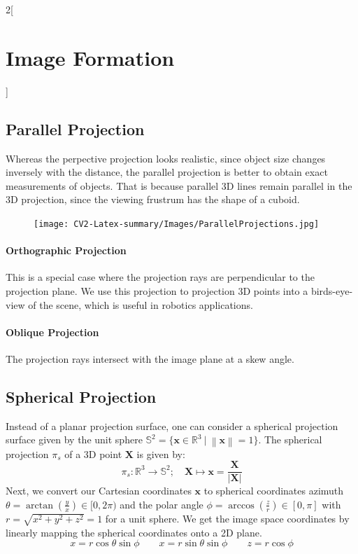 \documentclass[oneside,fontsize=11pt,paper=a4]{scrartcl}
\newcommand\norm[1]{\left\lVert#1\right\rVert}
\begin{document}
\begin{multicols}{2}[\section{Image Formation}]
\subsection{Parallel Projection}

Whereas the perpective projection looks realistic, since object size changes inversely with the distance, the parallel projection is better to obtain exact measurements of objects. That is because parallel 3D lines remain parallel in the 3D projection, since the viewing frustrum has the shape of a cuboid.

\begin{figure}
    \texttt{[image: CV2-Latex-summary/Images/ParallelProjections.jpg]}
\end{figure}

\paragraph{Orthographic Projection} This is a special case where the projection rays are perpendicular to the projection plane. We use this projection to projection 3D points into a birds-eye-view of the scene, which is useful in robotics applications.

\paragraph{Oblique Projection} The projection rays intersect with the image plane at a skew angle. 

\subsection{Spherical Projection}
Instead of a planar projection surface, one can consider a spherical projection surface given by the unit sphere $\mathbb{S}^2 = \{\mathbf{x} \in \mathbb{R}^3 \ \vert \ \norm{\mathbf{x}}=1\}$.
The spherical projection $\pi_s$ of a 3D point $\boldsymbol{X}$ is given by:
\begin{equation*}
    \pi_s: \mathbb{R}^3 \rightarrow \mathbb{S}^2; \quad \boldsymbol{X} \mapsto \boldsymbol{x} = \frac{\boldsymbol{X}}{|\boldsymbol{X}|}
\end{equation*}
Next, we convert our Cartesian coordinates $\mathbf{x}$ to spherical coordinates azimuth $\theta=\arctan(\frac{y}{x})\in[0,2\pi)$ and the polar angle $\phi=\arccos(\frac{z}{r})\in[0,\pi]$ with $r=\sqrt{x^2+y^2+z^2}=1$ for a unit sphere. We get the image space coordinates by linearly mapping the spherical coordinates onto a 2D plane.
\begin{equation*}
    x = r\cos\theta\sin\phi 
    \quad\quad
    x = r\sin\theta\sin\phi 
    \quad\quad
    z = r\cos\phi
\end{equation*}


\end{multicols}
\end{document}

